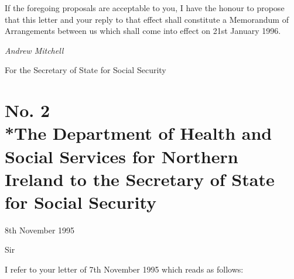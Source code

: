\documentclass[12pt,a4paper]{article}
\begin{document}
  If the foregoing proposals are acceptable to you, I have the honour to propose that this letter and your reply to that effect shall constitute a Memorandum of Arrangements between us which shall come into effect on 21st January 1996.

  \emph{Andrew Mitchell}

  For the Secretary of State for Social Security

\section*{\sloppy No. 2\\*The Department of Health and Social Services for Northern Ireland to the Secretary of State for Social Security}

8th November 1995

  Sir

  I refer to your letter of 7th November 1995 which reads as follows:
\end{document}
